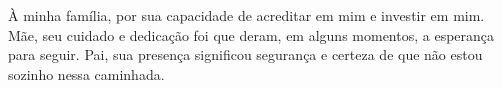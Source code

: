 À minha família, por sua capacidade de acreditar em mim e investir em mim. Mãe, seu cuidado e 
dedicação foi que deram, em alguns momentos, a esperança para seguir. Pai, sua presença significou 
segurança e certeza de que não estou sozinho nessa caminhada.